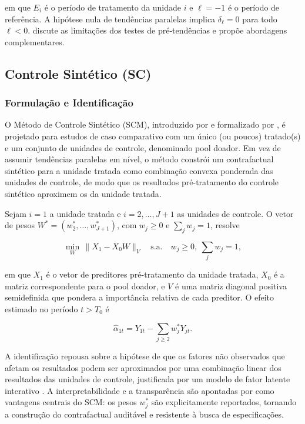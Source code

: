 \documentclass[a4paper,12pt]{article}
\begin{document}
em que $E_i$ é o período de tratamento da unidade $i$ e $\ell = -1$ é o período de
referência. A hipótese nula de tendências paralelas implica $\delta_\ell = 0$ para todo
$\ell < 0$.  discute as limitações dos testes de pré-tendências e
propõe abordagens complementares.

\subsection{Controle Sintético (SC)}

\subsubsection{Formulação e Identificação}

O Método de Controle Sintético (SCM), introduzido por  e
formalizado por , é projetado para estudos de caso
comparativo com um único (ou poucos) tratado(s) e um conjunto de unidades de controle,
denominado pool doador. Em vez de assumir tendências paralelas em nível, o método constrói
um contrafactual sintético para a unidade tratada como combinação convexa ponderada das
unidades de controle, de modo que os resultados pré-tratamento do controle sintético
aproximem os da unidade tratada.

Sejam $i = 1$ a unidade tratada e $i = 2, \dots, J+1$ as unidades de controle. O vetor de
pesos $W^* = (w^*_2, \dots, w^*_{J+1})$, com $w_j \ge 0$ e $\sum_j w_j = 1$, resolve

\begin{equation}
\min_{W}\, \| X_1 - X_0 W \|_V \quad \text{s.a.} \quad w_j \geq 0,\ \sum_j w_j = 1,
\end{equation}

em que $X_1$ é o vetor de preditores pré-tratamento da unidade tratada, $X_0$ é a matriz
correspondente para o pool doador, e $V$ é uma matriz diagonal positiva
semidefinida que pondera a importância relativa de cada preditor. O efeito estimado no
período $t > T_0$ é

\begin{equation}
\hat{\alpha}_{1t} = Y_{1t} - \sum_{j \ge 2} w^*_j Y_{jt}.
\end{equation}

A identificação repousa sobre a hipótese de que os fatores não observados que afetam os
resultados podem ser aproximados por uma combinação linear dos resultados das unidades
de controle, justificada por um modelo de fator latente interativo \cite{abadie2021}. A
interpretabilidade e a transparência são apontadas por  como
vantagens centrais do SCM: os pesos $w^*_j$ são explicitamente reportados, tornando a
construção do contrafactual auditável e resistente à busca de especificações.
\end{document}

